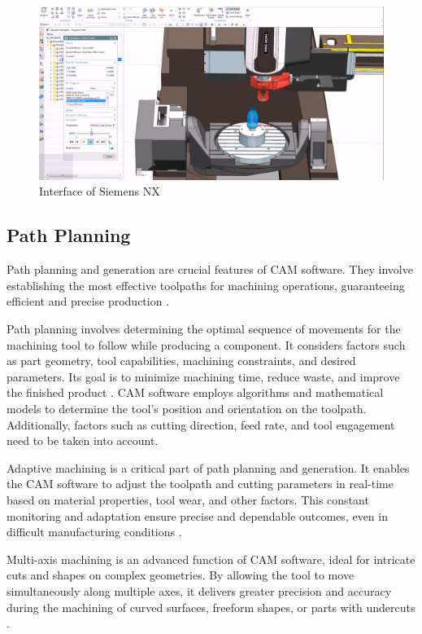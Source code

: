 \begin{figure}[H]
	\centerline{\includegraphics[scale=.4]{figures/CAM.png}}
	\caption{Interface of Siemens NX \cite{NXManufacturing.2015}}
	\label{CAMinterface}
\end{figure}


\subsection{Path Planning}
Path planning and generation are crucial features of CAM software. They involve establishing the most effective toolpaths for machining operations, guaranteeing efficient and precise production \cite{Brecher.2013}.

Path planning involves determining the optimal sequence of movements for the machining tool to follow while producing a component. It considers factors such as part geometry, tool capabilities, machining constraints, and desired parameters. Its goal is to minimize machining time, reduce waste, and improve the finished product \cite{Xu.2015}. CAM software employs algorithms and mathematical models to determine the tool's position and orientation on the toolpath. Additionally, factors such as cutting direction, feed rate, and tool engagement need to be taken into account\cite{Tunc.2017}.

Adaptive machining is a critical part of path planning and generation. It enables the CAM software to adjust the toolpath and cutting parameters in real-time based on material properties, tool wear, and other factors. This constant monitoring and adaptation ensure precise and dependable outcomes, even in difficult manufacturing conditions \cite{Liu.2017}.

Multi-axis machining is an advanced function of CAM software, ideal for intricate cuts and shapes on complex geometries. By allowing the tool to move simultaneously along multiple axes, it delivers greater precision and accuracy during the machining of curved surfaces, freeform shapes, or parts with undercuts \cite{Takeuchi.2014}.

